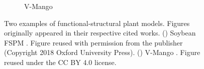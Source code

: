 \begin{figure}[t]
\begin{subfigure}[b]{0.48\linewidth}
        \caption{V-Mango}
        \label{fig:fspm-vmango}
    \end{subfigure}
    \caption[Two examples of functional-structural plant models.]{
            Two examples of functional-structural plant models. 
            Figures originally appeared in their respective cited works.
            () Soybean FSPM \citep{coussement_turgor-driven_2020}. Figure reused with permission from the publisher (Copyright 2018 Oxford University Press).
            () V-Mango \citep{boudon_v-mango_2020}. Figure reused under the CC BY 4.0 license.
    }
    \label{fig:plant_model_examples}
\end{figure}

